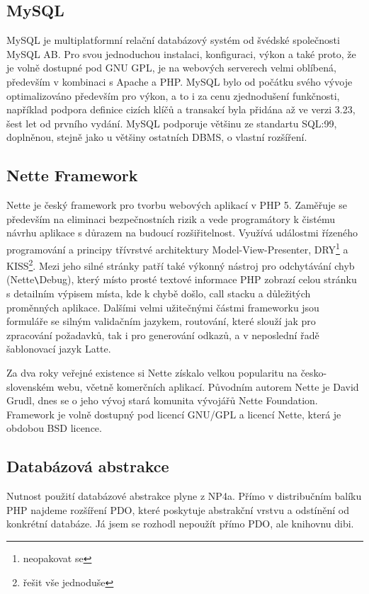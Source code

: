 \documentclass[11pt,twoside,a4paper]{book}
\begin{document}
\subsection{MySQL}
MySQL je multiplatformní relační databázový systém od švédské společnosti MySQL AB. Pro svou jednoduchou instalaci, konfiguraci, výkon a také proto, že je volně dostupné pod GNU GPL, je na webových serverech velmi oblíbená, především v kombinaci s Apache a PHP. MySQL bylo od počátku svého vývoje optimalizováno především pro výkon, a to i za cenu zjednodušení funkčnosti, například podpora definice cizích klíčů a transakcí byla přidána až ve verzi 3.23, šest let od prvního vydání. MySQL podporuje většinu ze standartu SQL:99, doplněnou, stejně jako u většiny ostatních DBMS, o vlastní rozšíření.

\subsection{Nette Framework}
Nette je český framework pro tvorbu webových aplikací v PHP 5. Zaměřuje se především na eliminaci bezpečnostních rizik a vede programátory k čistému návrhu aplikace s důrazem na budoucí rozšiřitelnost. Využívá událostmi řízeného programování a principy třívrstvé architektury Model-View-Presenter, DRY\footnote{neopakovat se} a KISS\footnote{řešit vše jednoduše}. Mezi jeho silné stránky patří také výkonný nástroj pro odchytávání chyb (Nette\verb|\|Debug), který místo prosté textové informace PHP zobrazí celou stránku s detailním výpisem místa, kde k chybě došlo, call stacku a důležitých proměnných aplikace. Dalšími velmi užitečnými částmi frameworku jsou formuláře se silným validačním jazykem, routování, které slouží jak pro zpracování požadavků, tak i pro generování odkazů, a v neposlední řadě šablonovací jazyk Latte.

Za dva roky veřejné existence si Nette získalo velkou popularitu na česko-slovenském webu, včetně komerčních aplikací. Původním autorem Nette je David Grudl, dnes se o jeho vývoj stará komunita vývojářů Nette Foundation. Framework je volně dostupný pod licencí GNU/GPL a licencí Nette, která je obdobou BSD licence\cite{nette:licence}.

\subsection{Databázová abstrakce}
Nutnost použití databázové abstrakce plyne z NP4a. Přímo v distribučním balíku PHP najdeme rozšíření PDO, které poskytuje abstrakční vrstvu a odstínění od konkrétní databáze. Já jsem se rozhodl nepoužít přímo PDO, ale knihovnu dibi.
\end{document}
